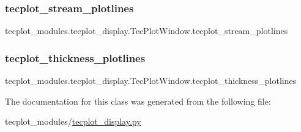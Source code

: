 \subsubsection{\texorpdfstring{tecplot\+\_\+stream\+\_\+plotlines}{tecplot\_stream\_plotlines}}
{\footnotesize\ttfamily tecplot\+\_\+modules.\+tecplot\+\_\+display.\+Tec\+Plot\+Window.\+tecplot\+\_\+stream\+\_\+plotlines}

\hypertarget{a00110_a3291e8bf0c5c69a20e3e9299dc363db2}{}\label{a00110_a3291e8bf0c5c69a20e3e9299dc363db2} 
\subsubsection{\texorpdfstring{tecplot\+\_\+thickness\+\_\+plotlines}{tecplot\_thickness\_plotlines}}
{\footnotesize\ttfamily tecplot\+\_\+modules.\+tecplot\+\_\+display.\+Tec\+Plot\+Window.\+tecplot\+\_\+thickness\+\_\+plotlines}



The documentation for this class was generated from the following file\+:\begin{DoxyCompactItemize}
\item 
tecplot\+\_\+modules/\hyperlink{a00038}{tecplot\+\_\+display.\+py}\end{DoxyCompactItemize}
